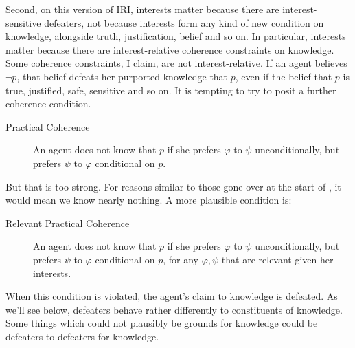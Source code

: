 \documentclass[oneside]{book}
\begin{document}
Second, on this version of IRI, interests matter because there are interest-sensitive defeaters, not because interests form any kind of new condition on knowledge, alongside truth, justification, belief and so on. In particular, interests matter because there are interest-relative coherence constraints on knowledge. Some coherence constraints, I claim, are not interest-relative. If an agent believes $\neg p$, that belief defeats her purported knowledge that $p$, even if the belief that $p$ is true, justified, safe, sensitive and so on. It is tempting to try to posit a further coherence condition.

\begin{description}
\item[Practical Coherence] An agent does not know that $p$ if she prefers $\varphi$ to $\psi$ unconditionally, but prefers $\psi$ to $\varphi$ conditional on $p$.
\end{description}

\noindent But that is too strong. For reasons similar to those gone over at the start of \cite{Hawthorne2004}, it would mean we know nearly nothing. A more plausible condition is:

\begin{description}
\item[Relevant Practical Coherence] An agent does not know that $p$ if she prefers $\varphi$ to $\psi$ unconditionally, but prefers $\psi$ to $\varphi$ conditional on $p$, for any $\varphi, \psi$ that are relevant given her interests.
\end{description}

\noindent When this condition is violated, the agent's claim to knowledge is defeated. As we'll see below, defeaters behave rather differently to constituents of knowledge. Some things which could not plausibly be grounds for knowledge could be defeaters to defeaters for knowledge.
\end{document}
